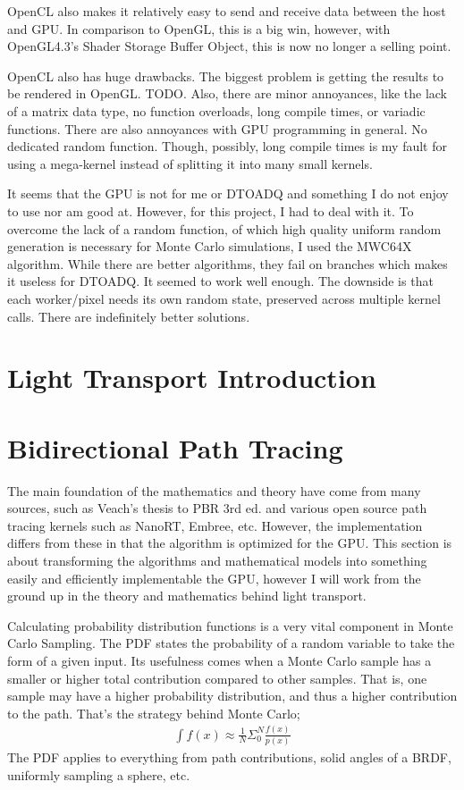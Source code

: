 \message{ !name(test.tex)}\documentclass{article}
\begin{document}
  	OpenCL also makes it relatively easy to send and receive data between the
host and GPU. In comparison to OpenGL, this is a big win, however, with
OpenGL4.3's Shader Storage Buffer Object, this is now no longer a selling point.
  	
  	OpenCL also has huge drawbacks. The biggest problem is getting the results
to be rendered in OpenGL. TODO. Also, there are minor annoyances, like the lack
of a matrix data type, no function overloads, long compile times, or variadic
functions. There are also annoyances with GPU programming in general. No
dedicated random function. Though, possibly, long compile times is my fault for
using a mega-kernel instead of splitting it into many small kernels.
  	
  	It seems that the GPU is not for me or DTOADQ and something I do not enjoy
to use nor am good at. However, for this project, I had to deal with it. To
overcome the lack of a random function, of which high quality uniform random
generation is necessary for Monte Carlo simulations, I used the MWC64X
algorithm. While there are better algorithms, they fail on branches which makes
it useless for DTOADQ. It seemed to work well enough. The downside is that each
worker/pixel needs its own random state, preserved across multiple kernel calls.
There are indefinitely better solutions.
  \section{Light Transport Introduction}
  \section{Bidirectional Path Tracing}
    The main foundation of the mathematics and theory have come from many
sources, such as Veach's thesis to PBR 3rd ed. and various open source path
tracing kernels such as NanoRT, Embree, etc. However, the implementation differs
from these in that the algorithm is optimized for the GPU. This section is about
transforming the algorithms and mathematical models into something easily and
efficiently implementable the GPU, however I will work from the ground up in the
theory and mathematics behind light transport.

    Calculating probability distribution functions is a very vital component in
Monte Carlo Sampling. The PDF states the probability of a random variable to
take the form of a given input. Its usefulness comes when a Monte Carlo
sample has a smaller or higher total contribution compared to other samples.
That is, one sample may have a higher probability distribution, and thus a
higher contribution to the path. That's the strategy behind Monte Carlo;
    \begin{align}
      \int f(x) \approx \frac{1}{N}\Sigma_0^N\frac{f(x)}{p(x)}
    \end{align}
    The PDF applies to everything from path contributions, solid angles of a
    BRDF, uniformly sampling a sphere, etc.
    
\end{document}
